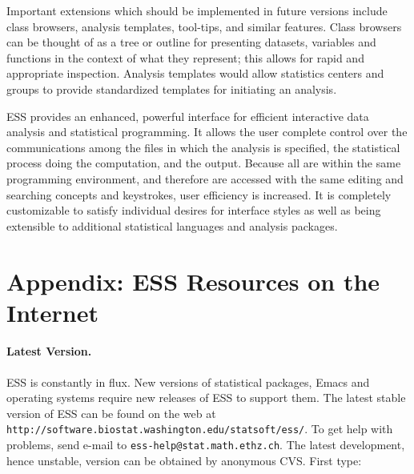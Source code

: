 \documentclass{article}
\def\url#1{\stexttt{#1}} %
\newcommand*{\SAS}{\textsc{SAS}}
\newcommand{\stexttt}[1]{{\small\texttt{#1}}}
\begin{document}

Important extensions which should be implemented in future
versions include class browsers, analysis templates, tool-tips, and
similar features.  Class browsers can be thought of as a tree or
outline for presenting datasets, variables and functions in the
context of what they represent; this allows for rapid and appropriate
inspection.  Analysis templates would allow statistics centers and
groups to provide standardized templates for initiating an analysis.

ESS provides 
an enhanced, powerful interface for efficient interactive data
analysis and statistical programming.  
It allows the user complete control over the communications among the
files in which the analysis is specified, the statistical process doing
the computation, and the output.  Because all are within the same programming
environment, and therefore are accessed with the same
editing and searching concepts and keystrokes, user efficiency is increased.
It is completely customizable
to satisfy individual desires for interface styles as well as being
extensible to additional statistical languages and analysis packages.






\clearpage

\appendix 
\section{Appendix: ESS Resources on the Internet}
\label{sec:access}

\paragraph{Latest Version.}

ESS is constantly in flux.  New versions of statistical
packages, Emacs and operating systems require new releases of ESS to
support them.  The latest stable version of ESS can be found on the web at
\url{http://software.biostat.washington.edu/statsoft/ess/}.  To get help
with problems, send e-mail to \url{ess-help@stat.math.ethz.ch}.
The latest development, hence unstable, version can be obtained by
anonymous CVS.  First type:
\end{document}
